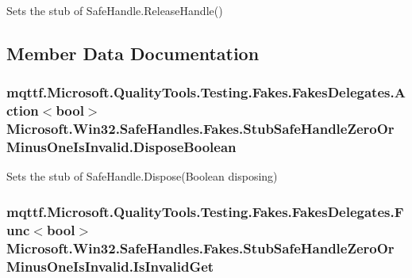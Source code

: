 Sets the stub of Safe\-Handle.\-Release\-Handle()



\subsection{Member Data Documentation}
\hypertarget{class_microsoft_1_1_win32_1_1_safe_handles_1_1_fakes_1_1_stub_safe_handle_zero_or_minus_one_is_invalid_a5911adcabfcd0bb4ddbef9018e0aadb5}{
\subsubsection[{Dispose\-Boolean}]{\setlength{\rightskip}{0pt plus 5cm}mqttf.\-Microsoft.\-Quality\-Tools.\-Testing.\-Fakes.\-Fakes\-Delegates.\-Action$<$bool$>$ Microsoft.\-Win32.\-Safe\-Handles.\-Fakes.\-Stub\-Safe\-Handle\-Zero\-Or\-Minus\-One\-Is\-Invalid.\-Dispose\-Boolean}}\label{class_microsoft_1_1_win32_1_1_safe_handles_1_1_fakes_1_1_stub_safe_handle_zero_or_minus_one_is_invalid_a5911adcabfcd0bb4ddbef9018e0aadb5}


Sets the stub of Safe\-Handle.\-Dispose(\-Boolean disposing)

\hypertarget{class_microsoft_1_1_win32_1_1_safe_handles_1_1_fakes_1_1_stub_safe_handle_zero_or_minus_one_is_invalid_a727daf840cdce37da9899b2725d73f11}{
\subsubsection[{Is\-Invalid\-Get}]{\setlength{\rightskip}{0pt plus 5cm}mqttf.\-Microsoft.\-Quality\-Tools.\-Testing.\-Fakes.\-Fakes\-Delegates.\-Func$<$bool$>$ Microsoft.\-Win32.\-Safe\-Handles.\-Fakes.\-Stub\-Safe\-Handle\-Zero\-Or\-Minus\-One\-Is\-Invalid.\-Is\-Invalid\-Get}}\label{class_microsoft_1_1_win32_1_1_safe_handles_1_1_fakes_1_1_stub_safe_handle_zero_or_minus_one_is_invalid_a727daf840cdce37da9899b2725d73f11}


